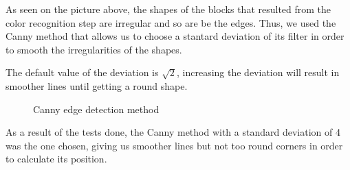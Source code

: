 As seen on the picture above, the shapes of the blocks that resulted from the color recognition step are irregular and so are be the edges. Thus, we used the Canny method that allows us to choose a stantard deviation of its filter in order to smooth the irregularities of the shapes.\par 



The default value of the deviation is $\sqrt{2}$, increasing the deviation will result in smoother lines until getting a round shape.

\begin{figure}[H]
\hfill
{}
\hfill
{}
\hfill
{}
\hfill
{}
\hfill

\caption{Canny edge detection method}

\end{figure}

As a result of the tests done, the Canny method with a standard deviation of 4 was the one chosen, giving us smoother lines but not too round corners in order to calculate its position.



 